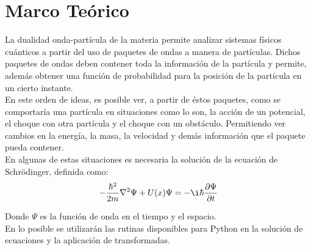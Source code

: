 \documentclass{article}
\begin{document}
\section{Marco Teórico}
La dualidad onda-partícula de la materia permite analizar sistemas físicos cuánticos a partir del uso de paquetes de ondas a manera de partículas. Dichos paquetes de ondas deben contener toda la información de la partícula y permite, además obtener una función de probabilidad para la posición de la partícula en un cierto instante.\\
En este orden de ideas, es posible ver, a partir de éstos paquetes, como se comportaría una partícula en situaciones como lo son, la acción de un potencial, el choque con otra partícula y el choque con un obstáculo. Permitiendo ver cambios en la energía, la masa, la velocidad y demás información que el paquete pueda contener.\\
En algunas de estas situaciones es necesaria la solución de la ecuación de Schrödinger, definida como:
\begin{equation}
-\frac{\hbar^2}{2m}\nabla^2 \Psi + U(x)\Psi=-\i \hbar \frac{\partial \Psi}{\partial t}
\end{equation}

Donde $\Psi$ es la función de onda en el tiempo y el espacio.\\
En lo posible se utilizarán las rutinas disponibles para Python en la solución de ecuaciones y la aplicación de transformadas.
\end{document}
